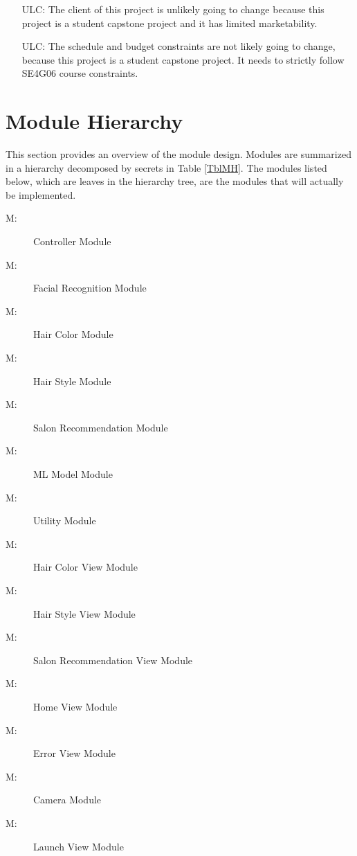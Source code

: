 \documentclass[12pt, titlepage]{article}
\newcounter{ucnum}
\newcounter{mnum}
\newcommand{\mthemnum}{M\themnum}
\begin{document}
\begin{itemize}
\item[ULC\refstepcounter{ucnum}\theucnum\label{ULC_meaningfulLabel}:] 
The client of this project is unlikely going to change because this project is a student capstone project and it has limited marketability.
\item[ULC\refstepcounter{ucnum}\theucnum\label{ULC_meaningfulLabel}:] 
The schedule and budget constraints are not likely going to change, because this project is a student capstone project. It needs to strictly follow SE4G06 course constraints.








\end{itemize}

\section{Module Hierarchy} \label{SecMH}

This section provides an overview of the module design. Modules are summarized
in a hierarchy decomposed by secrets in Table \ref{TblMH}. The modules listed
below, which are leaves in the hierarchy tree, are the modules that will
actually be implemented.

\begin{description}
\item [ \mthemnum \label{mHH}:] Controller Module
\item [ \mthemnum \label{mHH}:] Facial Recognition Module
\item [ \mthemnum \label{mHH}:] Hair Color Module
\item [ \mthemnum \label{mHH}:] Hair Style Module
\item [ \mthemnum \label{mHH}:] Salon Recommendation Module
\item [ \mthemnum \label{mHH}:] ML Model Module
\item [ \mthemnum \label{mHH}:] Utility Module
\item [ \mthemnum \label{mHH}:] Hair Color View Module
\item [ \mthemnum \label{mHH}:] Hair Style View Module
\item [ \mthemnum \label{mHH}:] Salon Recommendation View Module
\item [ \mthemnum \label{mHH}:] Home View Module
\item [ \mthemnum \label{mHH}:] Error View Module
\item [ \mthemnum \label{mHH}:] Camera Module
\item [ \mthemnum \label{mHH}:] Launch View Module
\end{description}
\end{document}
